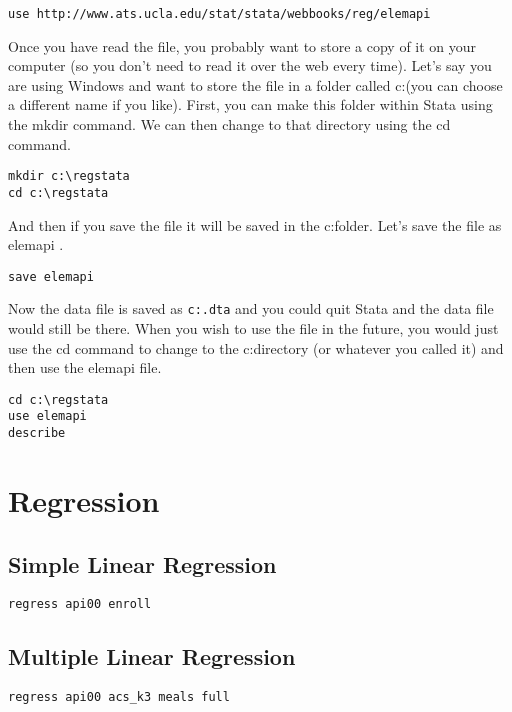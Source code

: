 

\begin{framed}
\begin{verbatim}
use http://www.ats.ucla.edu/stat/stata/webbooks/reg/elemapi
\end{verbatim}
\end{framed}

Once you have read the file, you probably want to store a copy of it on your computer (so you don't need to read it over the web every time).  Let's say you are using Windows and want to store the file in a folder called c:\regstata (you can choose a different name if you like). First, you can make this folder within Stata using the mkdir command. We can then change to that directory using the cd command.

\begin{framed}
\begin{verbatim}
mkdir c:\regstata
cd c:\regstata
\end{verbatim}
\end{framed}

And then if you save the file it will be saved in the c:\regstata folder. Let's save the file as elemapi .

\begin{framed}
\begin{verbatim}
save elemapi
\end{verbatim}
\end{framed}
Now the data file is saved as \texttt{c:\regstata\elemapi.dta} and you could quit Stata and the data file would still be there.  When you wish to use the file in the future, you would just use the cd command to change to the c:\regstata directory (or whatever you called it) and then use the elemapi file.

\begin{framed}
\begin{verbatim}
cd c:\regstata
use elemapi
describe
\end{verbatim}
\end{framed}
\newpage
\section{Regression }
\subsection{Simple Linear Regression}
\begin{framed}
\begin{verbatim}
regress api00 enroll
\end{verbatim}
\end{framed}


\subsection{Multiple Linear Regression}
\begin{framed}
\begin{verbatim}
regress api00 acs_k3 meals full
\end{verbatim}
\end{framed}


